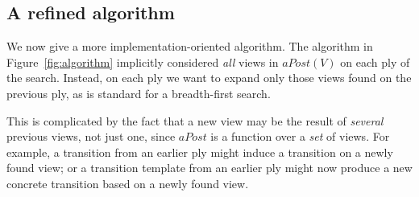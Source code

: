 
\subsection{A refined algorithm}
\label{ssec:algorithm-2}

We now give a more implementation-oriented algorithm.  The algorithm in
Figure~\ref{fig:algorithm} implicitly considered \emph{all} views in
$aPost(V)$ on each ply of the search.  Instead, on each ply we want to expand
only those views found on the previous ply, as is standard for a breadth-first
search.  

This is complicated by the fact that a new view may be the result of
\emph{several} previous views, not just one, since $aPost$ is a
function over a \emph{set} of views.  For example, a transition from an
earlier ply might induce a transition on a newly found view; or a transition
template from an earlier ply might now produce a new concrete transition based
on a newly found view.  




